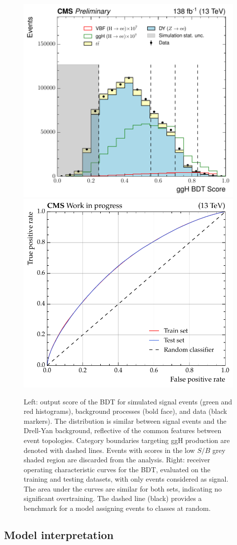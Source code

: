 \begin{figure}[htbp!]
\centering
\includegraphics[width =0.47\linewidth]{Figures/Hee/ggH/dataMC/ggH_BDT_pt_reweighted_output_score.pdf}\hfill%
\includegraphics[width =0.48\linewidth]{Figures/Hee/ggH/dataMC/ggH_BDT_pt_reweighted_ROC_curve.pdf}\hfill%
\caption[The output score distribution of the \ggH BDT and associated ROC curve.]{Left: output score of the \ggH BDT for simulated signal events (green and red histograms), background processes (bold face), and data (black markers). The distribution is similar between \ggH signal events and the Drell-Yan background, reflective of the common features between event topologies. Category boundaries targeting ggH production are denoted with dashed lines. Events with scores in the low $S/B$ grey shaded region are discarded from the analysis. Right: receiver operating characteristic curves for the \ggH BDT, evaluated on the training and testing datasets, with only \ggH events considered as signal. The area under the curves are similar for both sets, indicating no significant overtraining. The dashed line (black) provides a benchmark for a model assigning events to classes at random.}
\label{fig:hee_ggh_out_score_and_rocs}
\end{figure}

\subsection{Model interpretation}

